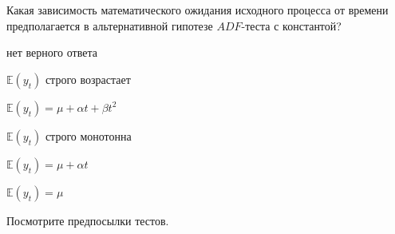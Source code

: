 
\begin{question}
Какая зависимость математического ожидания исходного процесса от времени предполагается в альтернативной гипотезе \(ADF\)-теста с константой?
\begin{answerlist}
  \item нет верного ответа
  \item \(\mathbb{E}(y_t)\) строго возрастает
  \item \(\mathbb{E}(y_t) = \mu + \alpha t + \beta t^2\)
  \item \(\mathbb{E}(y_t)\) строго монотонна
  \item \(\mathbb{E}(y_t) = \mu + \alpha t\)
  \item \(\mathbb{E}(y_t) = \mu\)
\end{answerlist}
\end{question}

\begin{solution}
Посмотрите предпосылки тестов.
\end{solution}

